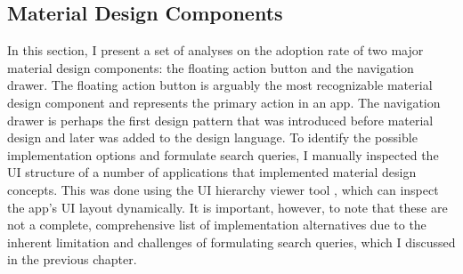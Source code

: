 \subsection{Material Design Components}
In this section, I present a set of analyses on the adoption rate of two major material design components: the floating action button and the navigation drawer.
The floating action button is arguably the most recognizable material design component and  represents the primary action in an app.
The navigation drawer is perhaps the first design pattern that was introduced before material design and later was added to the design language.
To identify the possible implementation options and formulate search queries, I manually inspected the UI structure of a number of applications that implemented material design concepts.
This was done using the UI hierarchy viewer tool \cite{hierarchy_viewer}, which can inspect the app's UI layout dynamically.
It is important, however, to note that these are not a complete, comprehensive list of implementation alternatives due to the inherent limitation and challenges of formulating search queries, which I discussed in the previous chapter.

